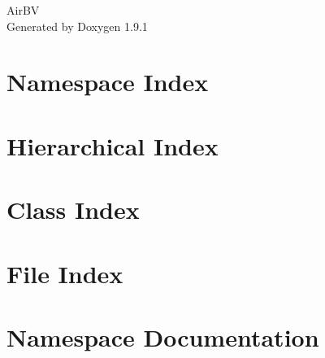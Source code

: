 \let\mypdfximage\pdfximage\def\pdfximage{\immediate\mypdfximage}\documentclass[twoside]{book}
\newcommand{\+}{\discretionary{\mbox{\scriptsize$\hookleftarrow$}}{}{}}
\newcommand{\clearemptydoublepage}{%
  \newpage{\pagestyle{empty}\cleardoublepage}%
}
\begin{document}
\raggedbottom

\hypersetup{pageanchor=false,
             bookmarksnumbered=true,
             pdfencoding=unicode
            }
\begin{titlepage}
\vspace*{7cm}
\begin{center}%
{\Large Air\+BV }\\
\vspace*{1cm}
{\large Generated by Doxygen 1.9.1}\\
\end{center}
\end{titlepage}
\clearemptydoublepage
{}
\tableofcontents
\clearemptydoublepage
{}
\hypersetup{pageanchor=true}

\chapter{Namespace Index}

\chapter{Hierarchical Index}

\chapter{Class Index}

\chapter{File Index}

\chapter{Namespace Documentation}










\end{document}
